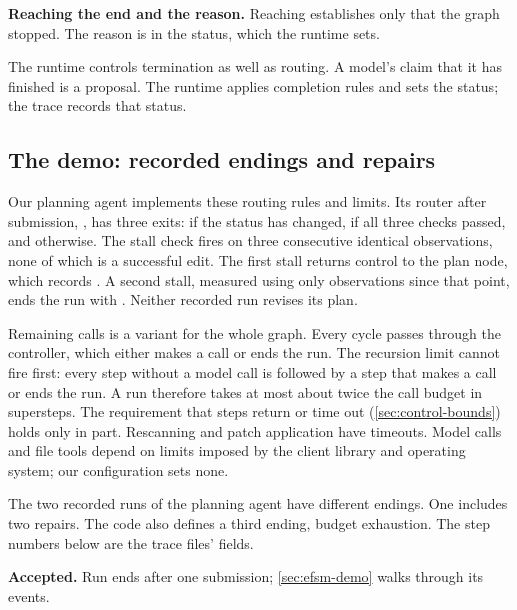 \item \textbf{Reaching the end and the reason.} Reaching  establishes only that the
graph stopped. The reason is in the status, which the runtime sets.

\ei

The runtime controls termination as well as routing. A model's claim that it has finished is a
proposal. The runtime applies completion rules and sets the status; the trace records that status.

\subsection{The demo: recorded endings and repairs}
\label{sec:control-demo}

Our planning agent implements these routing rules and limits. Its router after submission,
, has three exits:  if the status has changed,
 if all three checks passed, and  otherwise. The stall check
fires on three consecutive identical observations, none of which is a successful edit. The first
stall returns control to the plan node, which records . A second stall,
measured using only observations since that point, ends the run with .
Neither recorded run revises its plan.

Remaining calls is a variant for the whole graph. Every cycle passes through the controller,
which either makes a call or ends the run. The recursion limit cannot fire first: every step
without a model call is followed by a step that makes a call or ends the run. A run therefore
takes at most about twice the call budget in supersteps. The requirement that steps return or
time out (\cref{sec:control-bounds}) holds only in part. Rescanning and patch application have
timeouts. Model calls and file tools depend on limits imposed by the client library and operating
system; our configuration sets none.

The two recorded runs of the planning agent have different endings. One includes two repairs. The code also
defines a third ending, budget exhaustion. The step numbers below are the trace files'
 fields.

\bi

\item \textbf{Accepted.} Run  ends  after one submission;
\cref{sec:efsm-demo} walks through its events.

